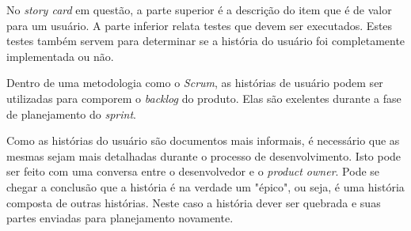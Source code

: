 No \emph{story card} em questão, a parte superior é a descrição do item que é de valor para um usuário. A parte inferior relata testes que devem ser executados. Estes testes também servem para determinar se a história do usuário foi completamente implementada ou não.

Dentro de uma metodologia como o \emph{Scrum}, as histórias de usuário podem ser utilizadas para comporem o \emph{backlog} do produto. Elas são exelentes durante a fase de planejamento do \emph{sprint}. 

Como as histórias do usuário são documentos mais informais, é necessário que as mesmas sejam mais detalhadas durante o processo de desenvolvimento. 
Isto pode ser feito com uma conversa entre o desenvolvedor e o \emph{product owner}. Pode se chegar a conclusão que a história é na verdade um "épico", ou seja, é uma história composta de outras histórias. Neste caso a história dever ser quebrada e suas partes enviadas para planejamento novamente. 



